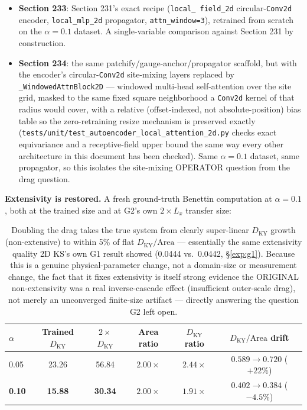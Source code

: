 \documentclass[11pt]{article}
\begin{document}
\begin{itemize}[nosep]
\item \textbf{Section 233}: Section 231's exact recipe (\texttt{local\_
field\_2d} circular-\texttt{Conv2d} encoder, \texttt{local\_mlp\_2d}
propagator, \texttt{attn\_window=3}), retrained from scratch on the
$\alpha{=}0.1$ dataset. A single-variable comparison against Section 231
by construction.
\item \textbf{Section 234}: the same patchify/gauge-anchor/propagator
scaffold, but with the encoder's circular-\texttt{Conv2d} site-mixing
layers replaced by \texttt{\_WindowedAttnBlock2D} --- windowed multi-head
self-attention over the site grid, masked to the same fixed square
neighborhood a \texttt{Conv2d} kernel of that radius would cover, with a
relative (offset-indexed, not absolute-position) bias table so the
zero-retraining resize mechanism is preserved exactly
(\texttt{tests/unit/test\_autoencoder\_local\_attention\_2d.py} checks
exact equivariance and a receptive-field upper bound the same way every
other architecture in this document has been checked). Same $\alpha=0.1$
dataset, same propagator, so this isolates the site-mixing OPERATOR
question from the drag question.
\end{itemize}

\textbf{Extensivity is restored.} A fresh ground-truth Benettin
computation at $\alpha=0.1$, both at the trained size and at G2's own
$2\times L_x$ transfer size:

\begin{table}[h]
\centering
\begin{tabular}{lccccc}
\toprule
$\alpha$ & Trained $D_{\mathrm{KY}}$ & $2\times$ $D_{\mathrm{KY}}$ & Area ratio & $D_{\mathrm{KY}}$ ratio & $D_{\mathrm{KY}}/\mathrm{Area}$ drift \\
\midrule
0.05 & 23.26 & 56.84 & $2.00\times$ & $2.44\times$ & $0.589\to0.720$ ($+22\%$) \\
\textbf{0.10} & \textbf{15.88} & \textbf{30.34} & $2.00\times$ & $\mathbf{1.91\times}$ & $\mathbf{0.402\to0.384}$ ($\mathbf{-4.5\%}$) \\
\bottomrule
\end{tabular}
\caption{Doubling the drag takes the true system from clearly
super-linear $D_{\mathrm{KY}}$ growth (non-extensive) to within 5\% of
flat $D_{\mathrm{KY}}/\mathrm{Area}$ --- essentially the same
extensivity quality 2D KS's own G1 result showed (0.0444 vs.\ 0.0442,
\S\ref{exp:g1}). Because this is a genuine physical-parameter
change, not a domain-size or measurement change, the fact that it fixes
extensivity is itself strong evidence the ORIGINAL non-extensivity was a
real inverse-cascade effect (insufficient outer-scale drag), not merely
an unconverged finite-size artifact --- directly answering the question
G2 left open.}
\label{tab:g2_extensivity}
\end{table}
\end{document}
